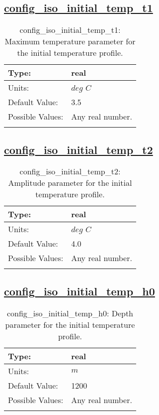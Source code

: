 \subsection[config\_iso\_initial\_temp\_t1]{\hyperref[sec:nm_tab_iso]{config\_iso\_initial\_temp\_t1}}
\label{subsec:nm_sec_config_iso_initial_temp_t1}
\begin{center}
\begin{longtable}{| p{2.0in} || p{4.0in} |}
    \hline
    Type: & real \\
    \hline
    Units: & $deg$ $C$ \\
    \hline
    Default Value: & 3.5 \\
    \hline
    Possible Values: & Any real number. \\
    \hline
    \caption{config\_iso\_initial\_temp\_t1: Maximum temperature parameter for the initial temperature profile.}
\end{longtable}
\end{center}
\subsection[config\_iso\_initial\_temp\_t2]{\hyperref[sec:nm_tab_iso]{config\_iso\_initial\_temp\_t2}}
\label{subsec:nm_sec_config_iso_initial_temp_t2}
\begin{center}
\begin{longtable}{| p{2.0in} || p{4.0in} |}
    \hline
    Type: & real \\
    \hline
    Units: & $deg$ $C$ \\
    \hline
    Default Value: & 4.0 \\
    \hline
    Possible Values: & Any real number. \\
    \hline
    \caption{config\_iso\_initial\_temp\_t2: Amplitude parameter for the initial temperature profile.}
\end{longtable}
\end{center}
\subsection[config\_iso\_initial\_temp\_h0]{\hyperref[sec:nm_tab_iso]{config\_iso\_initial\_temp\_h0}}
\label{subsec:nm_sec_config_iso_initial_temp_h0}
\begin{center}
\begin{longtable}{| p{2.0in} || p{4.0in} |}
    \hline
    Type: & real \\
    \hline
    Units: & $m$ \\
    \hline
    Default Value: & 1200 \\
    \hline
    Possible Values: & Any real number. \\
    \hline
    \caption{config\_iso\_initial\_temp\_h0: Depth parameter for the initial temperature profile.}
\end{longtable}
\end{center}
